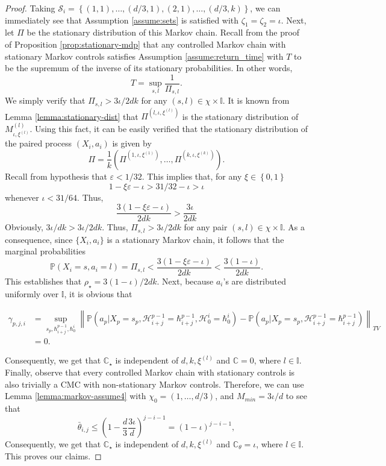 \documentclass[opre,sglanonrev]{informs4}
\numberwithin{equation}{section}
\newcommand{\pow}[1]{^{(#1)}}
\newcommand{\lp}{\left(}
\newcommand{\rp}{\right)}
\newcommand{\lc}{\left\{}
\newcommand{\rc}{\right\}}
\newcommand{\lV}{\left\|}
\newcommand{\rV}{\right\|}
\newcommand{\History}{\mathcal{H}}
\newcommand{\history}{\hbar}
\newcommand{\Cbb}{\mathbb{C}}
\newcommand{\Ibb}{\mathbb{I}}
\newcommand{\Pbb}{\mathbb{P}}
\newcommand{\Scal}{\mathcal{S}}
\newcommand{\constant}{\Cbb}
\newcommand{\prob}{\Pbb}
\newcommand{\probl}{\prob}
\newcommand{\eps}{\varepsilon}
\begin{document}
\begin{APPENDICES}
{\begin{proof}
Taking $\Scal_i=\lc(1,1),\dots,(d/3,1),(2,1),\dots,(d/3,k) \rc$, we can immediately see that Assumption \ref{assume:sets} is satisfied with $\zeta_1=\zeta_2=\iota$. 
Next, let $\Pi$ be the stationary distribution of this Markov chain.
Recall from the proof of Proposition \ref{prop:stationary-mdp} that any controlled Markov chain with stationary Markov controls satisfies Assumption \ref{assume:return_time} with $T$ to be the supremum of the inverse of its stationary probabilities. In other words,
\[
T=\sup_{s,l}\frac{1}{\Pi_{s,l}}.
\]
We simply verify that $\Pi_{s,l}>3\iota/2dk$ for any $(s,l)\in\chi\times \Ibb$.
It is known from Lemma \ref{lemma:stationary-dist} that $\Pi\pow{l,\iota,\xi\pow{l}}$ is the stationary distribution of $M_{\iota,\xi\pow{l}}\pow{l}$.
Using this fact, it can be easily verified that the stationary distribution of the paired process $(X_i,a_i)$ is given by 
\[
\Pi = \frac{1}{k}\lp\Pi\pow{1,\iota,\xi\pow{1}},\dots,\Pi\pow{k,\iota,\xi\pow{k}}\rp.
\]
Recall from hypothesis that $\eps<1/32$. This implies that, for any $\xi\in\lc0,1\rc$ \[1-\xi\eps-\iota>31/32-\iota>\iota\] whenever $\iota<31/64$. 
Thus,
\[
\frac{3(1-\xi\eps-\iota)}{2dk}>\frac{3\iota}{2dk}
\]
Obviously, $3\iota/dk>3\iota/2dk$. Thus, $\Pi_{s,l}>3\iota/2dk$ for any pair $(s,l)\in\chi\times \Ibb$. 
As a consequence, since $\{X_i,a_i\}$ is a stationary Markov chain, it follows that the marginal probabilities
\[
\prob(X_i=s,a_i=l)={\Pi_{s,l}}<\frac{3(1-\xi\eps-\iota)}{2dk}<\frac{3(1-\iota)}{2dk}.
\]
This establishes that $\rho_\star = 3(1-\iota)/2dk$.
Next, because $a_i$'s are distributed uniformly over $\Ibb$, it is obvious that
\begin{small}
\begin{align*}
   \gamma_{p,j,i}
   &= \sup_{s_p,\history_{i+j}^{p-1},\history_0^i}\lV\probl\lp a_p|X_p=s_p,\History_{i+j}^{p-1}=\history_{i+j}^{p-1},\History_0^i=\history_{0}^{i}\rp
   -\probl\lp a_p|X_p=s_p,\History_{i+j}^{p-1}=\history_{i+j}^{p-1}\rp\rV_{TV}\\
   & =0. 
\end{align*}
\end{small}
Consequently, we get that $\constant_\star$ is independent of $d,k,\xi\pow{l}$ and $\constant=0$, where $l\in\Ibb$.
Finally, observe that every controlled Markov chain with stationary controls is also trivially a CMC with non-stationary Markov controls.
Therefore, we can use Lemma \ref{lemma:markov-assume4} with $\chi_0=(1,\dots,d/3)$, and $M_{min}=3\iota/d$ to see that 
\[
\bar\theta_{i,j} \leq \lp 1-\frac{d}{3}\frac{3\iota}{d}\rp^{j-i-1}=(1-\iota)^{j-i-1},
\]
Consequently, we get that $\constant_\star$ is independent of $d,k,\xi\pow{l}$ and $\constant_\theta=\iota$, where $l\in\Ibb$. 
This proves our claims.
\end{proof}
}

\end{APPENDICES}
\end{document}

